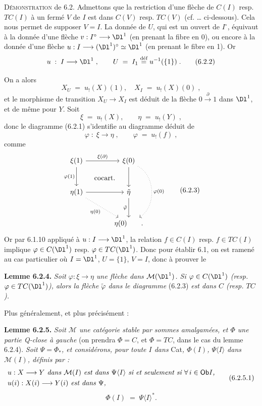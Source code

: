 \textsc{Démonstration} de 6.2. Admettons que la restriction d'une flèche de $C(I)$ resp. $TC(I)$ à un fermé $V$ de $I$ est dans $C(V)$ resp. $TC(V)$ (cf. \dots{} ci-dessous). Cela nous permet de supposer $V = I$. La donnée de $U$, qui est un ouvert de $I^{\circ}$, équivaut à la donnée d'une flèche $v : I^{\circ} \longrightarrow \Dl^1$ (en prenant la fibre en 0), ou encore à la donnée d'une flèche $u : I \longrightarrow (\Dl^1)^{\circ} \simeq \Dl^1$ (en prenant le fibre en 1). Or %
\[
u \;:\; I \longrightarrow \Dl^1\;, \qquad U \;=\; I_1 \overset{\text{déf}}{=} u^{-1}(\{1\})\;.
\tag*{(6.2.2)}
\]

On a alors
\[
X_U \;=\; u_!(X)(1), \quad X_I \;=\; u_!(X)(0)\;,
\]
et le morphisme de transition $X_U \longrightarrow X_I$ est déduit de la flèche $0 \xrightarrow{\ \partial\ } 1$ dans $\Dl^1$, et de même pour $Y$. Soit
\[
\xi \;=\; u_!(X), \qquad \eta \;=\; u_!(Y)\;,
\]
donc le diagramme (6.2.1) s'identifie au diagramme déduit de
\[
\varphi \;:\; \xi \longrightarrow \eta\;, \qquad \varphi \;=\; u_!(f)\;,
\]
comme
\[
\begin{tikzcd}[row sep=large, column sep=large]
\xi(1) \arrow[r, "\xi(\partial)"] \arrow[d, "\varphi(1)"'] \arrow[dr, phantom, "\text{cocart.}"] & \xi(0) \arrow[d] \arrow[dd, dotted, bend left=60, "\varphi(0)"] \\
\eta(1) \arrow[r] \arrow[dr, dotted, "\eta(0)"'] & \tilde{\eta} \arrow[d, "\tilde{\varphi}"'] \\
 & \eta(0) \qquad .
\end{tikzcd}
\tag*{(6.2.3)}
\]
Or par 6.1.10 appliqué à $u : I \longrightarrow \Dl^1$, la relation $f \in C(I)$ resp. $f \in TC(I)$ implique $\varphi \in C(\Dl^1)$ resp. $\varphi \in TC(\Dl^1)$. Donc pour établir 6.1, on est ramené au cas particulier où $I = \Dl^1$, $U = \{1\}$, $V = I$, donc à prouver le

\textbf{Lemme 6.2.4.} \textit{Soit $\varphi : \xi \longrightarrow \eta$ une flèche dans $\mathcal{M}(\Dl^1)$. Si $\varphi \in C(\Dl^1)$ (resp.}
\textit{$\varphi \in TC(\Dl^1)$), alors la flèche $\tilde{\varphi}$ dans le diagramme} (6.2.3) \textit{est dans $C$ (resp. $TC$).}

Plus généralement, et plus précisément :

\textbf{Lemme 6.2.5.} \textit{Soit $\mathcal{M}$ une catégorie stable par sommes amalgamées, et $\Phi$ une partie Q-close à gauche} (on prendra $\Phi = C$, et $\Phi = TC$, dans le cas du lemme 6.2.4). \textit{Soit $\Psi = \Phi_{*}$, et considérons, pour toute $I$ dans} Cat\textit{, $\Phi(I)$, $\Psi\langle I\rangle$ dans $\mathcal{M}(I)$, définis par :}
\[
\begin{aligned}
&\text{\textit{$u : X \longrightarrow Y$ dans $\mathcal{M}(I)$ est dans $\Psi\langle I\rangle$ si et seulement si $\forall\, i \in \Ob I$,}}\\
&\text{\textit{$u(i) : X(i) \longrightarrow Y(i)$ est dans $\Psi$,}}
\end{aligned}
\tag*{(6.2.5.1)}
\]
\[
\Phi(I) \;=\; \Psi\langle I\rangle^{*}.
\tag*{(6.2.5.2)}
\]

